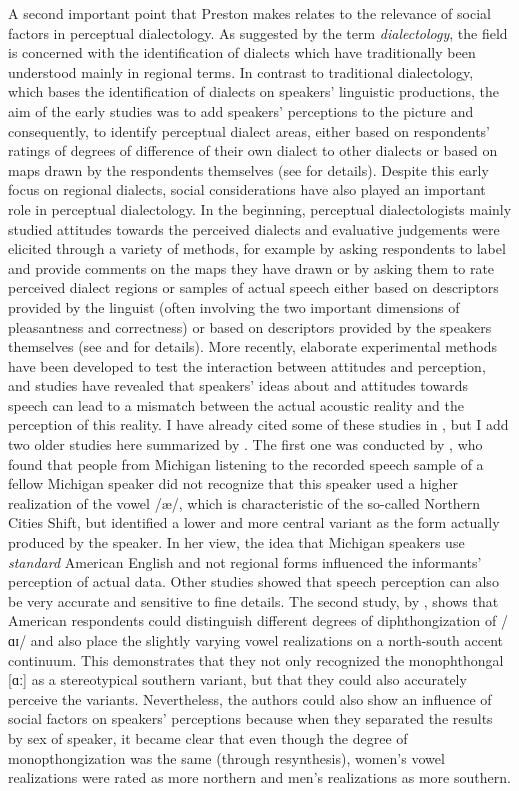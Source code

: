 A second important point that Preston makes relates to the relevance of social factors in perceptual dialectology. As suggested by the term \textit{dialectology}, the field is concerned with the identification of dialects which have traditionally been understood mainly in regional terms. In contrast to traditional dialectology, which bases the identification of dialects on speakers’ linguistic productions, the aim of the early studies was to add speakers’ perceptions to the picture and consequently, to identify perceptual dialect areas, either based on respondents’ ratings of degrees of difference of their own dialect to other dialects or based on maps drawn by the respondents themselves (see \citealt{Preston2018} for details). Despite this early focus on regional dialects, social considerations have also played an important role in perceptual dialectology. In the beginning, perceptual dialectologists mainly studied attitudes towards the perceived dialects and evaluative judgements were elicited through a variety of methods, for example by asking respondents to label and provide comments on the maps they have drawn or by asking them to rate perceived dialect regions or samples of actual speech either based on descriptors provided by the linguist (often involving the two important dimensions of pleasantness and correctness) or based on descriptors provided by the speakers themselves (see \citealt{Preston2018} and \citealt{Cramer2016} for details). More recently, elaborate experimental methods have been developed to test the interaction between attitudes and perception, and studies have revealed that speakers’ ideas about and attitudes towards speech can lead to a mismatch between the actual acoustic reality and the perception of this reality. I have already cited some of these studies in , but I add two older studies here summarized by \citet[197--199]{Preston2018}. The first one was conducted by \citet{Niedzielski1999}, who found that people from Michigan listening to the recorded speech sample of a fellow Michigan speaker did not recognize that this speaker used a higher realization of the vowel /æ/, which is characteristic of the so-called Northern Cities Shift, but identified a lower and more central variant as the form actually produced by the speaker. In her view, the idea that Michigan speakers use \textit{standard} American English and not regional forms influenced the informants’ perception of actual data. Other studies showed that speech perception can also be very accurate and sensitive to fine details. The second study, by \citet{Plichta2005}, shows that American respondents could distinguish different degrees of diphthongization of /ɑɪ/ and also place the slightly varying vowel realizations on a north-south accent continuum. This demonstrates that they not only recognized the monophthongal [ɑː] as a stereotypical southern variant, but that they could also accurately perceive the variants. Nevertheless, the authors could also show an influence of social factors on speakers’ perceptions because when they separated the results by sex of speaker, it became clear that even though the degree of monopthongization was the same (through resynthesis), women’s vowel realizations were rated as more northern and men’s realizations as more southern. 